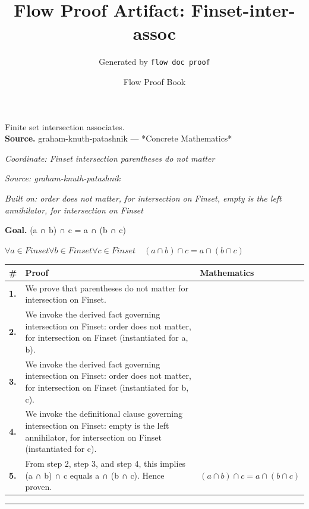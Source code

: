 \documentclass[11pt]{article}
\title{Flow Proof Artifact: Finset-inter-assoc}
\author{Generated by \texttt{flow doc proof}}
\date{Flow Proof Book}
\theoremstyle{definition}
\begin{document}
\maketitle
Finite set intersection associates.\\[0.5em]
\textbf{Source.} graham-knuth-patashnik — *Concrete Mathematics*\\[0.5em]
\bigskip
{}\par
\smallskip\noindent\textit{Coordinate: Finset \cdot intersection \cdot parentheses do not matter}\par
\smallskip\noindent\textit{Source: graham-knuth-patashnik}\par
\smallskip\noindent\textit{Built on: order does not matter, for intersection on Finset, empty is the left annihilator, for intersection on Finset}\par
\medskip
\noindent\textbf{Goal.} (a ∩ b) ∩ c = a ∩ (b ∩ c)\par
\noindent$\displaystyle \forall a \in Finset \forall b \in Finset \forall c \in Finset\quad (a ∩ b) ∩ c = a ∩ (b ∩ c)$\par
\medskip
\noindent
\begin{tabular}{@{} >{\raggedright\arraybackslash}p{} >{\raggedright\arraybackslash}p{} >{\raggedleft\arraybackslash}p{} @{}}
\textbf{\#} & \textbf{Proof} & \textbf{Mathematics} \\
\midrule
\textbf{1.} & We prove that parentheses do not matter for intersection on Finset. & \\[0.45em]
\textbf{2.} & We invoke the derived fact governing intersection on Finset: order does not matter, for intersection on Finset (instantiated for a, b). & \\[0.45em]
\textbf{3.} & We invoke the derived fact governing intersection on Finset: order does not matter, for intersection on Finset (instantiated for b, c). & \\[0.45em]
\textbf{4.} & We invoke the definitional clause governing intersection on Finset: empty is the left annihilator, for intersection on Finset (instantiated for c). & \\[0.45em]
\textbf{5.} & From step 2, step 3, and step 4, this implies (a ∩ b) ∩ c equals a ∩ (b ∩ c). Hence proven. & $\displaystyle (a ∩ b) ∩ c = a ∩ (b ∩ c)$ \\[0.45em]
\bottomrule
\end{tabular}
\label{thm:Finset-intersection-parentheses_do_not_matter}
\par\medskip\hrule
\end{document}
